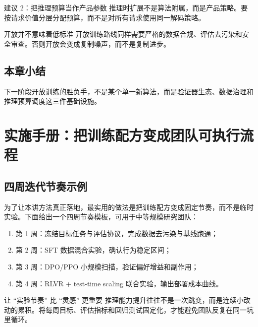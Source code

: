\documentclass[a4paper]{article}
\begin{document}
\begin{importantbox}{建议 2：把推理预算当作产品参数}
推理时扩展不是算法附属，而是产品策略。要按请求价值分层分配预算，而不是对所有请求使用同一解码策略。
\end{importantbox}

\begin{warningbox}{开放并不意味着低标准}
开放训练路线同样需要严格的数据合规、评估去污染和安全审查。否则开放会变成复制噪声，而不是复制进步。
\end{warningbox}

\subsection{本章小结}
下一阶段开放训练的胜负手，不是某个单一新算法，而是验证器生态、数据治理和推理预算调度这三件基础设施。


\section{实施手册：把训练配方变成团队可执行流程}

\subsection{四周迭代节奏示例}
为了让本讲方法真正落地，最实用的做法是把训练配方变成固定节奏，而不是临时实验。下面给出一个四周节奏模板，可用于中等规模研究团队：
\begin{enumerate}
    \item 第 1 周：冻结目标任务与评估协议，完成数据去污染与基线跑通；
    \item 第 2 周：SFT 数据混合实验，确认行为稳定区间；
    \item 第 3 周：DPO/PPO 小规模扫描，验证偏好增益和副作用；
    \item 第 4 周：RLVR + test-time scaling 联合实验，输出部署成本曲线。
\end{enumerate}

\begin{importantbox}{让 ``实验节奏'' 比 ``灵感'' 更重要}
推理能力提升往往不是一次跳变，而是连续小改动的累积。将每周目标、评估指标和回归测试固定化，才能避免团队反复在同一坑里循环。
\end{importantbox}
\end{document}
